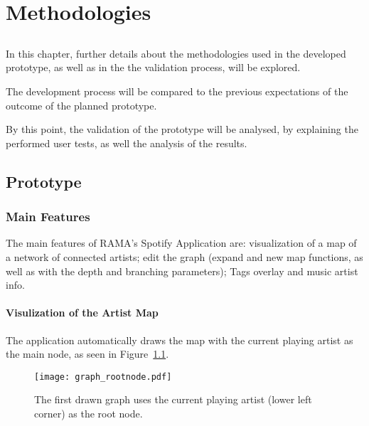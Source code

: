 

\chapter{Methodologies}
\label{chap:chap4}

\section*{}

In this chapter, further details about the methodologies used in the developed prototype, as well as in the the validation process, will be explored.

The development process will be compared to the previous expectations of the outcome of the planned prototype.

By this point, the validation of the prototype will be analysed, by explaining the performed user tests, as well the analysis of the results.


\section{Prototype} %
\label{sec:prototype}

  \subsection{Main Features} %
    \label{sub:main_features}
    
    The main features of RAMA's Spotify Application are: visualization of a map of a network of connected artists; edit the graph (expand and new map functions, as well as with the depth and branching parameters); Tags overlay and music artist info.

    \subsubsection{Visulization of the Artist Map} %
      \label{ssub:visualization}
    
      The application automatically draws the map with the current playing artist as the main node, as seen in Figure~\ref{fig:graph_rootnode}.

      \begin{figure}[tb]
        \begin{center}
          \texttt{[image: graph\_rootnode.pdf]}
        \end{center}
        \caption{The first drawn graph uses the current playing artist (lower left corner) as the root node.}
        \label{fig:graph_rootnode}
      \end{figure}

